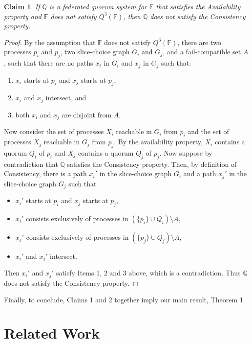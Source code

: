 \documentclass[11pt]{article}
\newtheorem{claim}{Claim}
\begin{document}
\begin{claim}
  \label{thm:Q3_must_hold}
  If $\mathbb{Q}$ is a federated quorum system for $\mathbb{F}$ that satisfies the Availability property and $\mathbb{F}$ does not satisfy $Q^3(\mathbb{F})$, then $\mathbb{Q}$ does not satisfy the Consistency property.
\end{claim}
\begin{proof}
  By the assumption that $\mathbb{F}$ does not satisfy $Q^3(\mathbb{F})$, there are two processes $p_i$ and $p_j$, two slice-choice graph $G_i$ and $G_j$, and a fail-compatible set $A$, such that there are no paths $x_i$ in $G_i$ and $x_j$ in $G_j$ such that:
  \begin{enumerate}
    \item $x_i$ starts at $p_i$ and $x_j$ starts at $p_j$,
    \item $x_i$ and $x_j$ intersect, and
    \item both $x_i$ and $x_j$ are disjoint from $A$.
  \end{enumerate}
  Now consider the set of processes $X_i$ reachable in $G_i$ from $p_i$ and the set of processes $X_j$ reachable in $G_j$ from $p_j$. By the availability property, $X_i$ contains a quorum $Q_i$ of $p_i$ and $X_j$ contains a quorum $Q_j$ of $p_j$.
  Now suppose by contradiction that $\mathbb{Q}$ satisfies the Consistency property.
  Then, by definition of Consistency, there is a path $x_i'$ in the slice-choice graph $G_i$ and a path $x_j'$ in the slice-choice graph $G_j$ such that
  \begin{itemize}
    \item $x_i'$ starts at $p_i$ and $x_j$ starts at $p_j$,
    \item $x_i'$ consists exclusively of processes in $\left(\{p_i\} \cup Q_i\right)\setminus A$,
    \item $x_j'$ consists exclusively of processes in $\left(\{p_j\} \cup Q_j\right)\setminus A$,
    \item $x_i'$ and $x_j'$ intersect.
  \end{itemize}
  Then $x_i'$ and $x_j'$ satisfy Items 1, 2 and 3 above, which is a contradiction. Thus $\mathbb{Q}$ does not satisfy the Consistency property.
\end{proof}

Finally, to conclude, Claims 1 and 2 together imply our main result, Theorem 1.

\section{Related Work}
\end{document}
